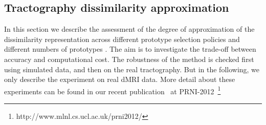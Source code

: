 \subsection{Tractography dissimilarity approximation}
\label{subsec:result_dissimilarity}
In this section we describe the assessment of the degree of approximation of the dissimilarity representation across different prototype selection policies and different numbers of prototypes \cite{olivetti2012approximation}. The aim is to investigate the trade-off between accuracy and computational cost. The robustness of the method is checked first using simulated data, and then on the real tractography. But in the following, we only describe the experiment on real dMRI data. More detail about these experiments can be found in our recent publication~\cite{olivetti2012approximation} at PRNI-2012~\footnote{http://www.mlnl.cs.ucl.ac.uk/prni2012/} %

